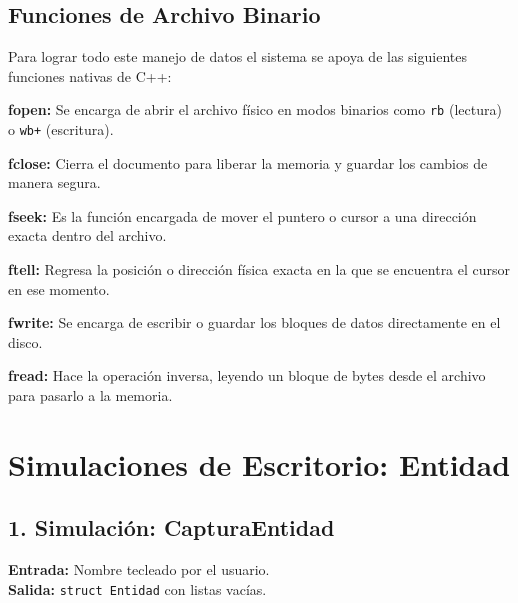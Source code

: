 \documentclass[12pt]{article}
\newcommand{\campo}[2]{
    \noindent\hangindent=1.2cm\makebox[0.6cm][l]{\color{MainBlue}\scriptsize$\bullet$} 
    \textbf{#1} #2 \par\vspace{0.1cm}
}
\begin{document}
\begin{figure}[htbp]
\label{fig:casos_eliminacion_entidad}
\end{figure}

{}
\subsection*{Funciones de Archivo Binario}
Para lograr todo este manejo de datos el sistema se apoya de las siguientes 
funciones nativas de C++: \newline \par
\campo{fopen:}{Se encarga de abrir el archivo físico en modos binarios como \texttt{rb} (lectura) o \texttt{wb+} (escritura).}
\campo{fclose:}{Cierra el documento para liberar la memoria y guardar los cambios de manera segura.}
\campo{fseek:}{Es la función encargada de mover el puntero o cursor a una dirección exacta dentro del archivo.}
\campo{ftell:}{Regresa la posición o dirección física exacta en la que se encuentra el cursor en ese momento.}
\campo{fwrite:}{Se encarga de escribir o guardar los bloques de datos directamente en el disco.}
\campo{fread:}{Hace la operación inversa, leyendo un bloque de bytes desde el archivo para pasarlo a la memoria.}

\newpage
\section{Simulaciones de Escritorio: Entidad}
{}
\subsection*{1. Simulación: CapturaEntidad}
\textbf{Entrada:} Nombre tecleado por el usuario.\\
\textbf{Salida:} \verb|struct Entidad| con listas vacías.
\end{document}
